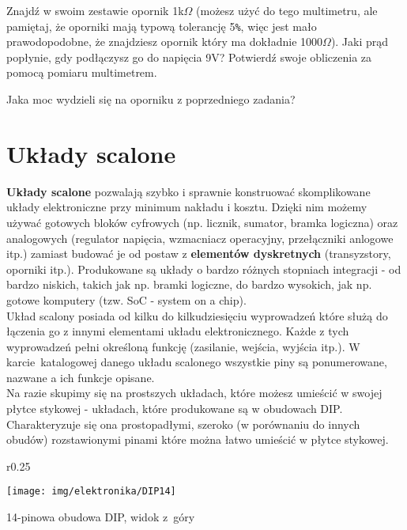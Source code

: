 \documentclass{pdfBooklets}
\begin{document}
\begin{Zadanie}{}{}
  Znajdź w swoim zestawie opornik 1k$\Omega$ (możesz użyć do tego multimetru, ale pamiętaj, że oporniki mają typową tolerancję 5\Verb$%
  więc jest mało prawodopodobne, że znajdziesz opornik który ma dokładnie 1000$\Omega$). Jaki prąd popłynie, gdy podłączysz go do napięcia 9V?
  Potwierdź swoje obliczenia za pomocą pomiaru multimetrem.
\end{Zadanie}

\begin{Zadanie}{}{}
  Jaka moc wydzieli się na oporniku z poprzedniego zadania?
\end{Zadanie}


\section{Układy scalone}
\textbf{Układy scalone} pozwalają szybko i sprawnie konstruować skomplikowane układy elektroniczne przy minimum nakładu i kosztu. Dzięki nim możemy
używać gotowych bloków cyfrowych (np. licznik, sumator, bramka logiczna) oraz analogowych (regulator napięcia, wzmacniacz operacyjny,
przełączniki anlogowe itp.) zamiast budować je od postaw z \textbf{elementów dyskretnych} (transyzstory, oporniki itp.). Produkowane są
układy o bardzo różnych stopniach integracji - od bardzo niskich, takich jak np. bramki logiczne, do bardzo wysokich, jak np. gotowe komputery
(tzw. SoC - system on a chip).
\\

Układ scalony posiada od kilku do kilkudziesięciu wyprowadzeń które służą do łączenia go z innymi elementami układu elektronicznego.
Każde z tych wyprowadzeń pełni określoną funkcję (zasilanie, wejścia, wyjścia itp.). W karcie~katalogowej danego układu scalonego wszystkie
piny są ponumerowane, nazwane a ich funkcje opisane.
\\

Na razie skupimy się na prostszych układach, które możesz umieścić w swojej płytce stykowej - układach, które produkowane są w obudowach DIP.
Charakteryzuje się ona prostopadłymi, szeroko (w porównaniu do innych obudów) rozstawionymi pinami które można łatwo umieścić w płytce stykowej.

\begin{wrapfigure}{r}{0.25\textwidth}
  \begin{center}
    \vspace{-20pt}
    \texttt{[image: img/elektronika/DIP14]}
    \vspace{-40pt}
    
    \small{14-pinowa obudowa DIP, widok z~góry}
    \vspace{-33pt}
  \end{center}
\end{wrapfigure}
\end{document}
